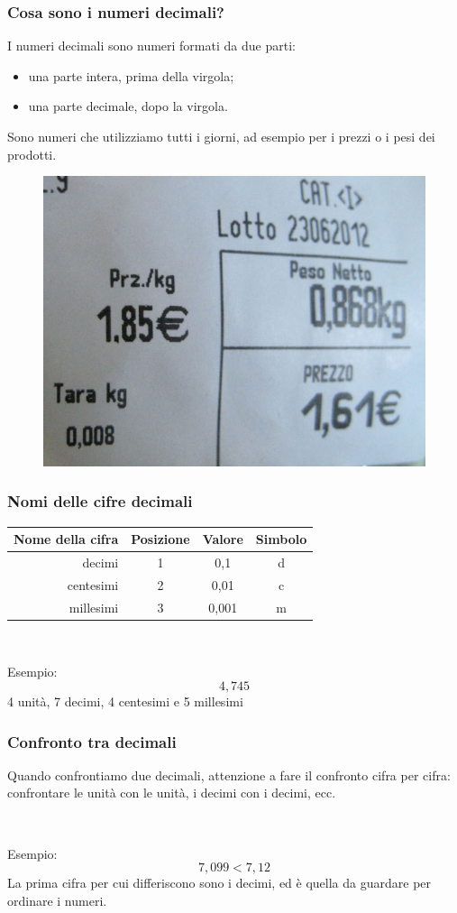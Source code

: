 \documentclass[handout]{beamer}
\theoremstyle{plain}
\begin{document}
\begin{frame}
\frametitle{Cosa sono i numeri decimali?}
I numeri decimali sono numeri formati da \alert{due parti}:
\begin{itemize}
  \item una \alert{parte intera}, prima della virgola;\pause
  \item una \alert{parte decimale}, dopo la virgola.\pause
\end{itemize}
Sono numeri che utilizziamo tutti i giorni, ad esempio per i prezzi o i pesi dei prodotti.

\begin{figure}
  \includegraphics[width=.4\columnwidth]{img/scontrino.jpg}
\end{figure}
\end{frame}


\begin{frame}
\frametitle{Nomi delle cifre decimali}
\begin{table}[]\def\arraystretch{1.5}
  \begin{tabular}{|r|c|c|c|}\hline
  \textbf{Nome della cifra} & \textbf{Posizione} & \textbf{Valore} & \textbf{Simbolo} \\\hline
  decimi                    & 1                  & 0,1             & d                \\\hline
  centesimi                 & 2                  & 0,01            & c                \\\hline
  millesimi                 & 3                  & 0,001           & m                \\\hline
  \end{tabular}
\end{table}\pause

~

Esempio:
\[ 4,745 \]
4 unità, 7 decimi, 4 centesimi e 5 millesimi
\end{frame}



\begin{frame}
\frametitle{Confronto tra decimali}
Quando confrontiamo due decimali, attenzione a fare il confronto \alert{cifra per cifra}: confrontare le unità con le unità, i decimi con i decimi, ecc.\pause

~

Esempio:
\[ 7,099 < 7,12 \]
La prima cifra per cui differiscono sono i decimi, ed è quella da guardare per ordinare i numeri.
\end{frame}
\end{document}
